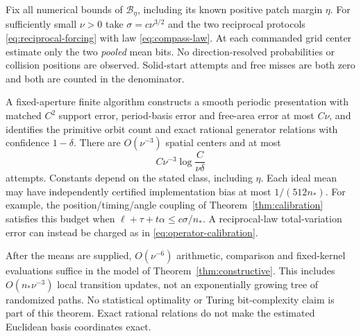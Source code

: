 \begin{theorem}
\label{thm:pooled-recovery}
Fix all numerical bounds of $\mathcal B_\eta$, including its known
positive patch margin $\eta$. For sufficiently small $\nu>0$ take
$\sigma=c\nu^{3/2}$ and the two reciprocal protocols
\eqref{eq:reciprocal-forcing} with law \eqref{eq:compass-law}.
At each commanded grid center estimate only the two \emph{pooled}
mean bits. No direction-resolved probabilities or collision positions
are observed. Solid-start attempts and free misses are both zero and
both are counted in the denominator.

A fixed-aperture finite algorithm constructs a smooth periodic
presentation with matched $C^2$ support error, period-basis error and
free-area error at most $C\nu$, and identifies the primitive orbit
count and exact rational generator relations with confidence
$1-\delta$. There are $O(\nu^{-3})$ spatial centers and at most
\begin{equation}\label{eq:pooled-budget}
                  C\nu^{-3}\log\frac{C}{\nu\delta}
\end{equation}
attempts. Constants depend on the stated class, including $\eta$.
Each ideal mean may have independently certified implementation bias
at most $1/(512n_*)$. For example, the position/timing/angle coupling
of Theorem~\ref{thm:calibration} satisfies this budget when
$\ell+\tau+t\alpha\le c\sigma/n_*$. A reciprocal-law total-variation
error can instead be charged as in \eqref{eq:operator-calibration}.

After the means are supplied, $O(\nu^{-6})$ arithmetic, comparison and
fixed-kernel evaluations suffice in the model of
Theorem~\ref{thm:constructive}. This includes $O(n_*\nu^{-3})$
local transition updates, not an exponentially growing tree of
randomized paths. No statistical optimality or Turing bit-complexity
claim is part of this theorem. Exact rational relations do not make
the estimated Euclidean basis coordinates exact.
\end{theorem}
